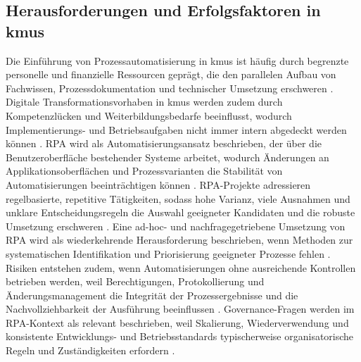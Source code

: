 \subsection{Herausforderungen und Erfolgsfaktoren in \glspl{kmu}}
Die Einführung von Prozessautomatisierung in \glspl{kmu} ist häufig durch begrenzte personelle und finanzielle Ressourcen geprägt, die den parallelen Aufbau von Fachwissen, Prozessdokumentation und technischer Umsetzung erschweren \cite{OECD2021DT_SME,OECD2021SMEsGoingDigital}. 
Digitale Transformationsvorhaben in \glspl{kmu} werden zudem durch Kompetenzlücken und Weiterbildungsbedarfe beeinflusst, wodurch Implementierungs- und Betriebsaufgaben nicht immer intern abgedeckt werden können \cite{OECD2021DT_SME,OECD2021SMEsGoingDigital}. 
RPA wird als Automatisierungsansatz beschrieben, der über die Benutzeroberfläche bestehender Systeme arbeitet, wodurch Änderungen an Applikationsoberflächen und Prozessvarianten die Stabilität von Automatisierungen beeinträchtigen können \cite{AalstBichlerHeinzl2018RPA,Moreira2023RPAReview}. 
RPA-Projekte adressieren regelbasierte, repetitive Tätigkeiten, sodass hohe Varianz, viele Ausnahmen und unklare Entscheidungsregeln die Auswahl geeigneter Kandidaten und die robuste Umsetzung erschweren \cite{AalstBichlerHeinzl2018RPA,Wanner2019ProcessSelection}. 
Eine ad-hoc- und nachfragegetriebene Umsetzung von RPA wird als wiederkehrende Herausforderung beschrieben, wenn Methoden zur systematischen Identifikation und Priorisierung geeigneter Prozesse fehlen \cite{Wanner2019ProcessSelection}. 
Risiken entstehen zudem, wenn Automatisierungen ohne ausreichende Kontrollen betrieben werden, weil Berechtigungen, Protokollierung und Änderungsmanagement die Integrität der Prozessergebnisse und die Nachvollziehbarkeit der Ausführung beeinflussen \cite{Schlegel2024RatingRisksRPA,COSO2025RPAICIF}. 
Governance-Fragen werden im RPA-Kontext als relevant beschrieben, weil Skalierung, Wiederverwendung und konsistente Entwicklungs- und Betriebsstandards typischerweise organisatorische Regeln und Zuständigkeiten erfordern \cite{Kedziora2021GovernanceModelsRPA,Plattfaut2022CSF_RPA}. 

